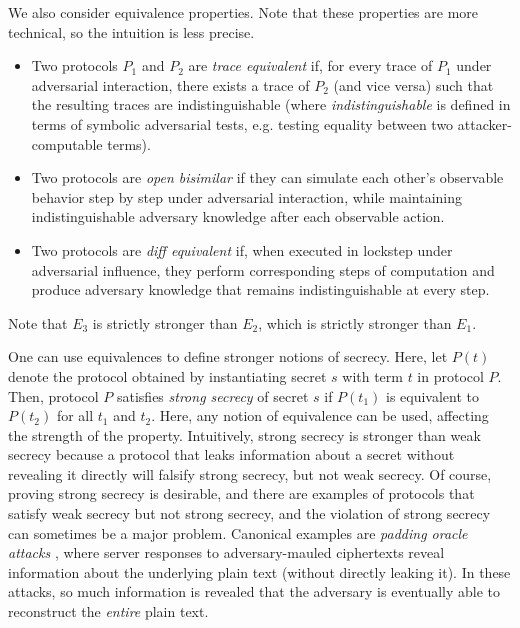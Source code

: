 \documentclass{article}
\theoremstyle{definition}
\begin{document}
We also consider equivalence properties. Note that these properties are more technical, so the intuition is less precise.
\begin{itemize}
    \item[$E_1$.] Two protocols $P_1$ and $P_2$ are \emph{trace equivalent} \cite{trace_eq} if, 
    for every trace of $P_1$ under adversarial interaction, there exists a trace of $P_2$ (and vice versa) 
    such that the resulting traces are indistinguishable 
    (where \emph{indistinguishable} is defined in terms of symbolic adversarial tests, 
    e.g. testing equality between two attacker-computable terms).
    \item[$E_2$.] Two protocols are \emph{open bisimilar} \cite{open_bs} if they can simulate each other's 
    observable behavior step by step under adversarial interaction, 
    while maintaining indistinguishable adversary knowledge after each observable action.
    \item[$E_3$.] Two protocols are \emph{diff equivalent} \cite{proverif_equations} if, when executed 
in lockstep under adversarial influence, 
they perform corresponding steps of computation and produce adversary knowledge that remains indistinguishable 
at every step.
\end{itemize}

Note that $E_3$ is strictly stronger than $E_2$, which is strictly stronger than $E_1$. 

One can use equivalences to define stronger notions of secrecy. 
Here, let $P(t)$ denote  the protocol obtained by instantiating secret $s$ with term $t$ in protocol $P$. 
Then, protocol $P$ satisfies \emph{strong secrecy} of secret $s$ if $P(t_1)$ is equivalent to $P(t_2)$ 
for all $t_1$ and $t_2$. Here, any notion of equivalence can be used, affecting the strength of the property. 
Intuitively, strong secrecy is stronger than weak secrecy because a protocol that leaks information 
about a secret without revealing it directly will falsify strong secrecy, but not weak secrecy. 
Of course, proving strong secrecy is desirable, 
and there are examples of protocols that satisfy weak secrecy but not strong secrecy,
and the violation of strong secrecy can sometimes be a major problem. 
Canonical examples are \emph{padding oracle attacks} \cite{padding_oracle}, 
where server responses to adversary-mauled ciphertexts reveal information about the underlying plain text 
(without directly leaking it). In these attacks, 
so much information is revealed that the adversary is eventually able to reconstruct the \emph{entire} plain text.
\end{document}
